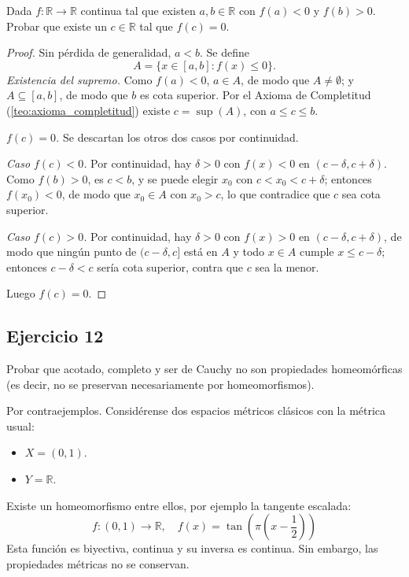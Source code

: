 \documentclass[11pt, a4paper]{article}
\begin{document}
Dada $f: \mathbb{R} \to \mathbb{R}$ continua tal que existen $a, b \in \mathbb{R}$ con $f(a) < 0$ y
$f(b) > 0$. Probar que existe un $c \in \mathbb{R}$ tal que $f(c) = 0$.

\begin{proof}
Sin pérdida de generalidad, $a < b$. Se define
$$ A = \{ x \in [a, b] : f(x) \le 0 \}. $$
\textit{Existencia del supremo.} Como $f(a) < 0$, $a \in A$, de modo que $A \neq \emptyset$; y
$A \subseteq [a, b]$, de modo que $b$ es cota superior. Por el Axioma de Completitud
(\ref{teo:axioma_completitud}) existe $c = \sup(A)$, con $a \le c \le b$.

\textit{$f(c) = 0$.} Se descartan los otros dos casos por continuidad.

\textit{Caso $f(c) < 0$.} Por continuidad, hay $\delta > 0$ con $f(x) < 0$ en
$(c - \delta, c + \delta)$. Como $f(b) > 0$, es $c < b$, y se puede elegir $x_0$ con
$c < x_0 < c + \delta$; entonces $f(x_0) < 0$, de modo que $x_0 \in A$ con $x_0 > c$, lo que contradice
que $c$ sea cota superior.

\textit{Caso $f(c) > 0$.} Por continuidad, hay $\delta > 0$ con $f(x) > 0$ en
$(c - \delta, c + \delta)$, de modo que ningún punto de $(c - \delta, c]$ está en $A$ y todo $x \in A$
cumple $x \le c - \delta$; entonces $c - \delta < c$ sería cota superior, contra que $c$ sea la
menor.

Luego $f(c) = 0$.
\end{proof}

\subsection*{Ejercicio 12}

Probar que acotado, completo y ser de Cauchy no son propiedades homeomórficas (es decir, no se
preservan necesariamente por homeomorfismos).

Por contraejemplos. Considérense dos espacios métricos clásicos con la métrica usual:
\begin{itemize}
    \item $X = (0, 1)$.
    \item $Y = \mathbb{R}$.
\end{itemize}
Existe un homeomorfismo entre ellos, por ejemplo la tangente escalada:
$$ f: (0, 1) \to \mathbb{R}, \quad f(x) = \tan\left( \pi \left( x - \frac{1}{2} \right) \right) $$
Esta función es biyectiva, continua y su inversa es continua. Sin embargo, las propiedades métricas
no se conservan.
\end{document}
